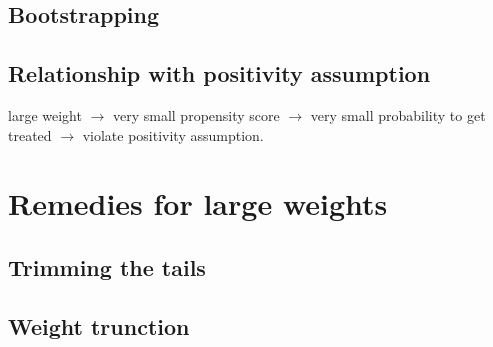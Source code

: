 \subsection{Bootstrapping}
\subsection{Relationship with positivity assumption}
large weight $\longrightarrow$ very small propensity score $\longrightarrow$ very small probability to get treated $\longrightarrow$ violate positivity assumption.


\section{Remedies for large weights}
\subsection{Trimming the tails}
\subsection{Weight trunction}

%
%
%
%
%